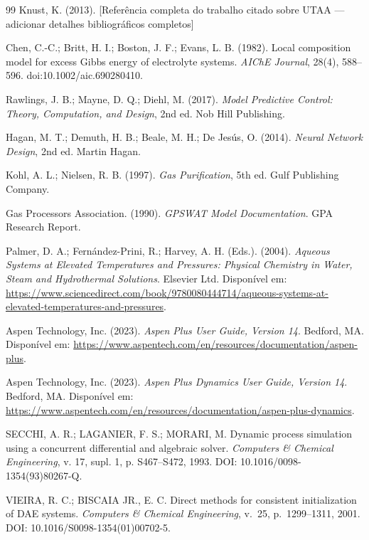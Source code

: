 \documentclass[10pt,a4paper]{article}
\begin{document}
\begin{thebibliography}{99}
 Knust, K. (2013). [Referência completa do trabalho citado sobre UTAA — adicionar detalhes bibliográficos completos]

 Chen, C.-C.; Britt, H. I.; Boston, J. F.; Evans, L. B. (1982). Local composition model for excess Gibbs energy of electrolyte systems. \emph{AIChE Journal}, 28(4), 588–596. doi:10.1002/aic.690280410.

 Rawlings, J. B.; Mayne, D. Q.; Diehl, M. (2017). \emph{Model Predictive Control: Theory, Computation, and Design}, 2nd ed. Nob Hill Publishing.

 Hagan, M. T.; Demuth, H. B.; Beale, M. H.; De Jesús, O. (2014). \emph{Neural Network Design}, 2nd ed. Martin Hagan.

 Kohl, A. L.; Nielsen, R. B. (1997). \emph{Gas Purification}, 5th ed. Gulf Publishing Company.

 Gas Processors Association. (1990). \emph{GPSWAT Model Documentation}. GPA Research Report.

 Palmer, D. A.; Fernández-Prini, R.; Harvey, A. H. (Eds.). (2004). \emph{Aqueous Systems at Elevated Temperatures and Pressures: Physical Chemistry in Water, Steam and Hydrothermal Solutions}. Elsevier Ltd. Disponível em: \url{https://www.sciencedirect.com/book/9780080444714/aqueous-systems-at-elevated-temperatures-and-pressures}.

 Aspen Technology, Inc. (2023). \emph{Aspen Plus User Guide, Version 14}. Bedford, MA. Disponível em: \url{https://www.aspentech.com/en/resources/documentation/aspen-plus}.

 Aspen Technology, Inc. (2023). \emph{Aspen Plus Dynamics User Guide, Version 14}. Bedford, MA. Disponível em: \url{https://www.aspentech.com/en/resources/documentation/aspen-plus-dynamics}.

 SECCHI, A. R.; LAGANIER, F. S.; MORARI, M. Dynamic process simulation using a concurrent differential and algebraic solver. \textit{Computers \& Chemical Engineering}, v. 17, supl. 1, p. S467--S472, 1993. DOI: 10.1016/0098-1354(93)80267-Q.

VIEIRA, R. C.; BISCAIA JR., E. C. Direct methods for consistent initialization of DAE systems. \textit{Computers \& Chemical Engineering}, v.~25, p.~1299--1311, 2001. DOI: 10.1016/S0098-1354(01)00702-5.

\end{thebibliography}
\end{document}
